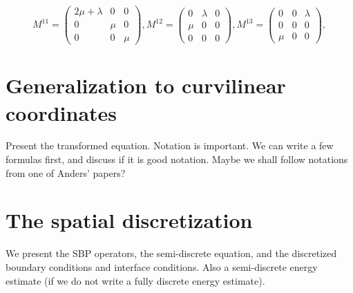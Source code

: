 \documentclass[a4paper]{article}
\begin{document}
\[ M^{11} = \left(\begin{array}{ccc}
2\mu+\lambda & 0 & 0\\
0 & \mu & 0\\
0 & 0 & \mu\end{array}\right), M^{12} = \left(\begin{array}{ccc}
0 & \lambda & 0\\
\mu & 0 & 0\\
0 & 0 & 0\end{array}\right), M^{13} = \left(\begin{array}{ccc}
0 & 0 & \lambda\\
0 & 0 & 0\\
\mu & 0 & 0\end{array}\right),\]


\section{Generalization to curvilinear coordinates}
Present the transformed equation. Notation is important. We can write a few formulas first, and discuss if it is good notation. Maybe we shall follow notations from one of Anders' papers?

\section{The spatial discretization}
We present the SBP operators, the semi-discrete equation, and the discretized boundary conditions and interface conditions. Also a semi-discrete energy estimate (if we do not write a fully discrete energy estimate).
\end{document}
